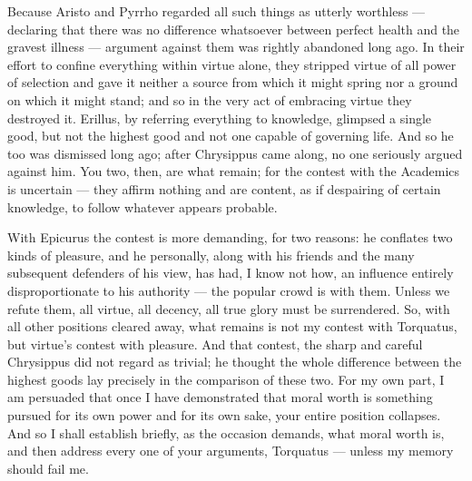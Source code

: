  Because Aristo and Pyrrho regarded all such things as utterly worthless — declaring that there was no difference whatsoever between perfect health and the gravest illness — argument against them was rightly abandoned long ago. In their effort to confine everything within virtue alone, they stripped virtue of all power of selection and gave it neither a source from which it might spring nor a ground on which it might stand; and so in the very act of embracing virtue they destroyed it. Erillus, by referring everything to knowledge, glimpsed a single good, but not the highest good and not one capable of governing life. And so he too was dismissed long ago; after Chrysippus came along, no one seriously argued against him. You two, then, are what remain; for the contest with the Academics is uncertain — they affirm nothing and are content, as if despairing of certain knowledge, to follow whatever appears probable.

 With Epicurus the contest is more demanding, for two reasons: he conflates two kinds of pleasure, and he personally, along with his friends and the many subsequent defenders of his view, has had, I know not how, an influence entirely disproportionate to his authority — the popular crowd is with them. Unless we refute them, all virtue, all decency, all true glory must be surrendered. So, with all other positions cleared away, what remains is not my contest with Torquatus, but virtue's contest with pleasure. And that contest, the sharp and careful Chrysippus did not regard as trivial; he thought the whole difference between the highest goods lay precisely in the comparison of these two. For my own part, I am persuaded that once I have demonstrated that moral worth is something pursued for its own power and for its own sake, your entire position collapses. And so I shall establish briefly, as the occasion demands, what moral worth is, and then address every one of your arguments, Torquatus — unless my memory should fail me.

